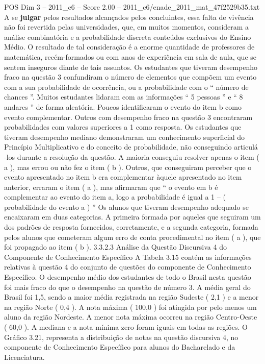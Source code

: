 \begin{textsample}{POS Dim 3 – 2011\_c6 – Score 2.00 – 2011\_c6/enade\_2011\_mat\_47f2529b35.txt}
A se \textbf{julgar} pelos resultados alcançados pelos concluintes, essa falta de vivência não foi revertida pelas universidades, que, em muitos momentos, consideram a análise combinatória e a probabilidade discreta conteúdos exclusivos do Ensino Médio.
O resultado de tal consideração é a enorme quantidade de professores de matemática, recém-formados ou com anos de experiência em sala de aula, que se sentem inseguros diante de tais assuntos.
Os estudantes que tiveram desempenho fraco na questão 3 confundiram o número de elementos que compõem um evento com a sua probabilidade de ocorrência, ou a probabilidade com o “ número de chances ”.
Muitos estudantes lidaram com as informações “ 5 pessoas ” e “ 8 andares ” de forma aleatória.
Poucos identificaram o evento do item b como evento complementar.
Outros com desempenho fraco na questão 3 encontraram probabilidades com valores superiores a 1 como resposta.
Os estudantes que tiveram desempenho mediano demonstraram um conhecimento superficial do Princípio Multiplicativo e do conceito de probabilidade, não conseguindo articulá -los durante a resolução da questão.
A maioria conseguiu resolver apenas o item ( a ), mas errou ou não fez o item ( b ).
Outros, que conseguiram perceber que o evento apresentado no item b era complementar àquele apresentado no item anterior, erraram o item ( a ), mas afirmaram que “ o evento em b é complementar ao evento do item a, logo a probabilidade é igual a 1 – ( probabilidade do evento a ) ” Os alunos que tiveram desempenho adequado se encaixaram em duas categorias.
A primeira formada por aqueles que seguiram um dos padrões de resposta fornecidos, corretamente, e a segunda categoria, formada pelos alunos que cometeram algum erro de conta procedimental no item ( a ), que foi propagado ao item ( b ). 3.3.2.3 Análise da Questão Discursiva 4 do Componente de Conhecimento Específico A Tabela 3.15 contém as informações relativas à questão 4 do conjunto de questões do componente de Conhecimento Específico.
O desempenho médio dos estudantes de todo o Brasil nesta questão foi mais fraco do que o desempenho na questão de número 3.
A média geral do Brasil foi 1,5, sendo a maior média registrada na região Sudeste ( 2,1 ) e a menor na região Norte ( 0,4 ).
A nota máxima ( 100,0 ) foi atingida por pelo menos um aluno da região Nordeste.
A menor nota máxima ocorreu na região Centro-Oeste ( 60,0 ).
A mediana e a nota mínima zero foram iguais em todas as regiões.
O Gráfico 3.21, representa a distribuição de notas na questão discursiva 4, no componente de Conhecimento Específico para alunos do Bacharelado e da Licenciatura.

\end{textsample}
